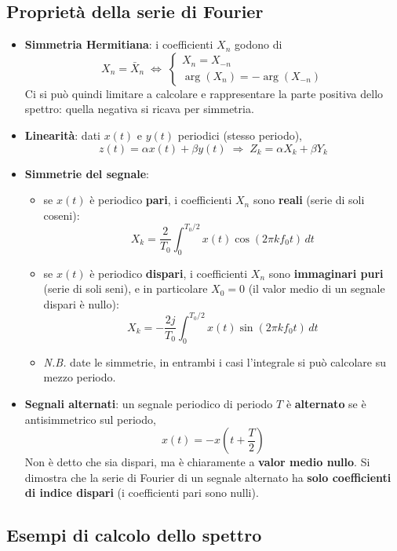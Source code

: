\documentclass[12pt, a4paper]{article}
\begin{document}
\subsection{Proprietà della serie di Fourier}
\begin{itemize}
    \item \textbf{Simmetria Hermitiana}: i coefficienti $X_n$ godono di
    $$X_n = \bar X_n \;\Longleftrightarrow\; \begin{cases} X_n = X_{-n} \\ \arg(X_n) = -\arg(X_{-n})\end{cases}$$
    Ci si può quindi limitare a calcolare e rappresentare la parte positiva dello spettro: quella negativa si ricava per simmetria.
    \item \textbf{Linearità}: dati $x(t)$ e $y(t)$ periodici (stesso periodo),
    $$z(t) = \alpha x(t) + \beta y(t) \;\Longrightarrow\; Z_k = \alpha X_k + \beta Y_k$$
    \item \textbf{Simmetrie del segnale}:
    \begin{itemize}
        \item se $x(t)$ è periodico \textbf{pari}, i coefficienti $X_n$ sono \textbf{reali} (serie di soli coseni):
        $$X_k = \frac{2}{T_0}\int_0^{T_0/2} x(t)\cos(2\pi kf_0t)\,dt$$
        \item se $x(t)$ è periodico \textbf{dispari}, i coefficienti $X_n$ sono \textbf{immaginari puri} (serie di soli seni), e in particolare $X_0=0$ (il valor medio di un segnale dispari è nullo):
        $$X_k = -\frac{2j}{T_0}\int_0^{T_0/2} x(t)\sin(2\pi kf_0t)\,dt$$
        \item[] \textit{N.B.} date le simmetrie, in entrambi i casi l'integrale si può calcolare su mezzo periodo.
    \end{itemize}
    \item \textbf{Segnali alternati}: un segnale periodico di periodo $T$ è \textbf{alternato} se è antisimmetrico sul periodo,
    $$x(t) = -x\!\left(t+\frac{T}{2}\right)$$
    Non è detto che sia dispari, ma è chiaramente a \textbf{valor medio nullo}. Si dimostra che la serie di Fourier di un segnale alternato ha \textbf{solo coefficienti di indice dispari} (i coefficienti pari sono nulli).
\end{itemize}

\subsection{Esempi di calcolo dello spettro}
\end{document}
